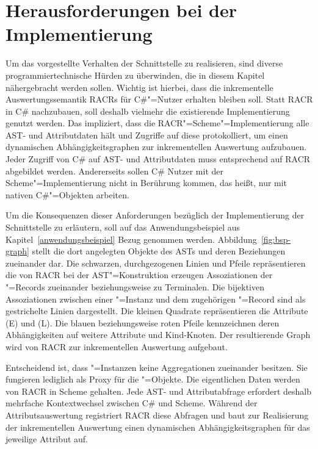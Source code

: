 \section{Herausforderungen bei der Implementierung}\label{probleme}

Um das vorgestellte Verhalten der Schnittstelle zu realisieren, sind diverse programmiertechnische Hürden zu überwinden, die in diesem Kapitel nähergebracht werden sollen. Wichtig ist hierbei, dass die inkrementelle Auswertungssemantik RACRs für C\#"=Nutzer erhalten bleiben soll. Statt RACR in C\# nachzubauen, soll deshalb vielmehr die existierende Implementierung genutzt werden. Das impliziert, dass die RACR"=Scheme"=Implementierung alle AST- und Attributdaten hält und Zugriffe auf diese protokolliert, um einen dynamischen Abhängigkeitsgraphen zur inkrementellen Auswertung aufzubauen. Jeder Zugriff von C\# auf AST- und Attributdaten muss entsprechend auf RACR abgebildet werden. Andererseits sollen C\# Nutzer mit der Scheme"=Implementierung nicht in Berührung kommen, das heißt, nur mit nativen C\#"=Objekten arbeiten.

Um die Konsequenzen dieser Anforderungen bezüglich der Implementierung der Schnittstelle zu erläutern, soll auf das Anwendungsbeispiel aus Kapitel~\ref{anwendungsbeispiel} Bezug genommen werden. Abbildung~\ref{fig:bsp-graph} stellt die dort angelegten Objekte des ASTs und deren Beziehungen zueinander dar. Die schwarzen, durchgezogenen Linien und Pfeile repräsentieren die von RACR bei der AST"=Konstruktion erzeugen Assoziationen der "=Records zueinander beziehungsweise zu Terminalen.  Die bijektiven Assoziationen zwischen einer "=Instanz und dem zugehörigen "=Record sind als gestrichelte Linien dargestellt. Die kleinen Quadrate repräsentieren die Attribute  (E) und  (L). Die blauen beziehungsweise roten Pfeile kennzeichnen deren Abhängigkeiten auf weitere Attribute und Kind-Knoten. Der resultierende Graph wird von RACR zur inkrementellen Auswertung aufgebaut.

Entscheidend ist, dass "=Instanzen keine Aggregationen zueinander besitzen. Sie fungieren lediglich als Proxy für die "=Objekte. Die eigentlichen Daten werden von RACR in Scheme gehalten. Jede AST- und Attributabfrage erfordert deshalb mehrfache Kontextwechsel zwischen C\# und Scheme. Während der Attributsauswertung registriert RACR diese Abfragen und baut zur Realisierung der inkrementellen Auswertung einen dynamischen Abhängigkeitsgraphen für das jeweilige Attribut auf.

